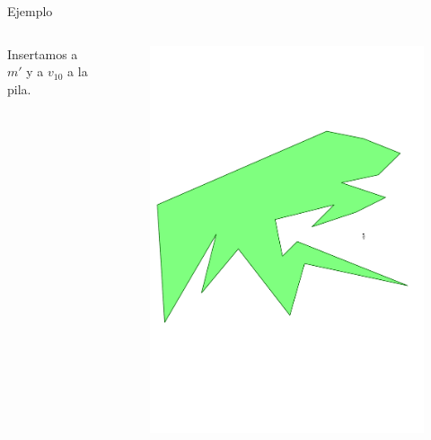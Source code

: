 \documentclass[aspectratio=169,xcolor=dvipsnames, t]{beamer}
\begin{document}
\begin{frame}{Ejemplo}
  \begin{columns}
    \begin{column}{0.3\textwidth}
      \raggedright %
      Insertamos a $m'$ y a $v_{10}$ a la pila.
    \end{column}
    \begin{column}{0.7\textwidth}
      \vspace{-2.5cm} %
      \begin{figure}
        \centering
        \includegraphics[width=1\linewidth, height=.95\textheight, page=23, keepaspectratio]{IPE/point_visibility.pdf}
      \end{figure}
    \end{column}
  \end{columns}
\end{frame}
\end{document}
